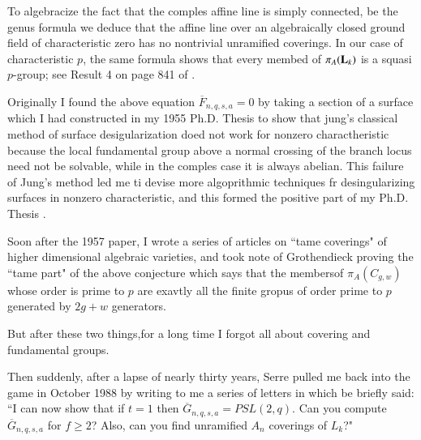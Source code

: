 To algebracize the fact that the comples affine line is simply connected, be the genus formula we deduce that the affine line over an algebraically closed ground field of characteristic zero has no nontrivial unramified coverings. In our case of characteristic $p$, the same formula shows that every membed of $\pi_{A}(\mathbf{L}_{k})$ is a squasi $p$-group; see Result 4 on page 841 of \cite{chap1-key3}.

Originally I found the above equation $\overline{F}_{n,q,s,a}=0$ by taking a section of a surface which I had constructed in my 1955 Ph.D. Thesis \cite{chap1-key1} to show that jung's classical method \cite{chap1-key40} of surface desigularization doed not work for nonzero charactheristic because the local fundamental group above a normal crossing of the branch locus need not be solvable, while in the comples case it is always abelian. This failure of Jung's method led me ti devise more algoprithmic techniques fr desingularizing surfaces in nonzero characteristic, and this formed the positive part of my Ph.D. Thesis \cite{chap1-key2}.

Soon after the 1957 paper, I wrote a series of articles \cite{chap1-key4} on ``tame coverings" of higher dimensional algebraic varieties, and took note of Grothendieck \cite{chap1-key33} proving the ``tame part" of the above conjecture which says that the members\pageoriginale of $\pi_{A}(C_{g,w})$ whose order is prime to $p$ are exavtly all the finite gropus of order prime to $p$ generated by $2g+w$ generators.

\newpage

But after these two things,for a long time I forgot all about covering and fundamental groups.

Then suddenly, after a lapse of nearly thirty years, Serre pulled me back into the game in October 1988 by writing to me a series of letters in which be briefly said: ``I can now show that if $t=1$ then $\overline{G}_{n,q,s,a}=PSL(2,q)$.
Can you compute $\overline{G}_{n,q,s,a}$ for $f\geq 2$? Also, can you find unramified $A_{n}$ coverings of $L_{k}$?"

